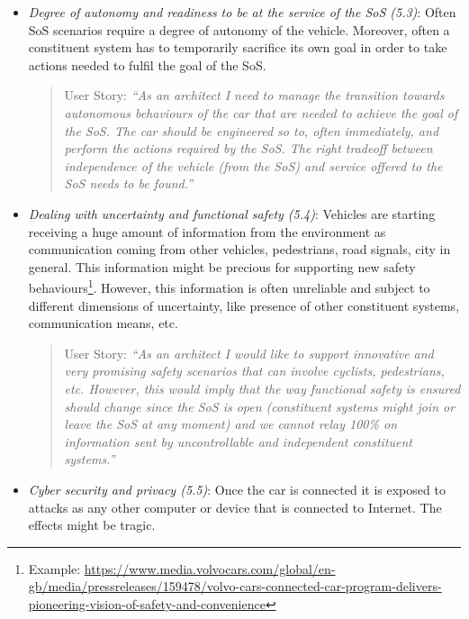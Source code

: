 \begin{itemize}
\begin{itemize}
\item {\em Degree of autonomy and readiness to be at the service of the SoS (5.3)}: Often SoS scenarios require a degree of autonomy of the vehicle. Moreover, often a constituent system has to temporarily sacrifice its own goal in order to take actions needed to fulfil the goal of the SoS.

\begin{quote}
{User Story:} 
\emph{``As an architect I need to manage the transition towards autonomous behaviours of the car that are needed to achieve the goal of the SoS. The car should be engineered so to, often immediately,  and perform the actions required by the SoS. The right tradeoff between independence of the vehicle (from the SoS) and service offered to the SoS needs to be found.''}
\end{quote}

\item {\em Dealing with uncertainty and functional safety (5.4)}: Vehicles are starting receiving a huge amount of information from the environment as communication coming from other vehicles, pedestrians, road signals, city in general. This information might be precious for supporting new safety behaviours\footnote{Example: \url{https://www.media.volvocars.com/global/en-gb/media/pressreleases/159478/volvo-cars-connected-car-program-delivers-pioneering-vision-of-safety-and-convenience}}. However, this information is often unreliable and subject to different dimensions of uncertainty, like presence of other constituent systems, communication means, etc.

\begin{quote}
{User Story:} 
\emph{``As an architect I would like to support innovative and very promising safety scenarios that can involve cyclists, pedestrians, etc. However, this would imply that the way functional safety is ensured should change since the SoS is open (constituent systems might join or leave the SoS at any moment) and we cannot relay 100\% on information sent by uncontrollable and independent constituent systems.''}
\end{quote}


\item {\em Cyber security and privacy (5.5)}: Once the car is connected it is exposed to attacks as any other computer or device that is connected to Internet. The effects might be tragic.


\end{itemize}
\end{itemize}
